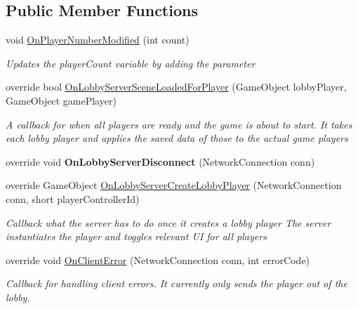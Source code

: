 \subsection*{Public Member Functions}
\begin{DoxyCompactItemize}
\item 
void \hyperlink{class_d_l_network_manager_afc0830b22829b7f7ace8e11528f4753b}{On\+Player\+Number\+Modified} (int count)
\begin{DoxyCompactList}\small\item\em Updates the player\+Count variable by adding the parameter \end{DoxyCompactList}\item 
override bool \hyperlink{class_d_l_network_manager_a011d87a7aa13ad654975c86e61ae1f97}{On\+Lobby\+Server\+Scene\+Loaded\+For\+Player} (Game\+Object lobby\+Player, Game\+Object game\+Player)
\begin{DoxyCompactList}\small\item\em A callback for when all players are ready and the game is about to start. It takes each lobby player and applies the saved data of those to the actual game players \end{DoxyCompactList}\item 
\hypertarget{class_d_l_network_manager_a2fd59c49e773c56b40fa58e88994272b}{}\label{class_d_l_network_manager_a2fd59c49e773c56b40fa58e88994272b} 
override void {\bfseries On\+Lobby\+Server\+Disconnect} (Network\+Connection conn)
\item 
override Game\+Object \hyperlink{class_d_l_network_manager_a0b8e454879f6d7cae15e71d2bce54816}{On\+Lobby\+Server\+Create\+Lobby\+Player} (Network\+Connection conn, short player\+Controller\+Id)
\begin{DoxyCompactList}\small\item\em Callback what the server has to do once it creates a lobby player The server instantiates the player and toggles relevant UI for all players \end{DoxyCompactList}\item 
override void \hyperlink{class_d_l_network_manager_a30212d32bdb0338d43148e8a65ef77a2}{On\+Client\+Error} (Network\+Connection conn, int error\+Code)
\begin{DoxyCompactList}\small\item\em Callback for handling client errors. It currently only sends the player out of the lobby. \end{DoxyCompactList}\end{DoxyCompactItemize}
